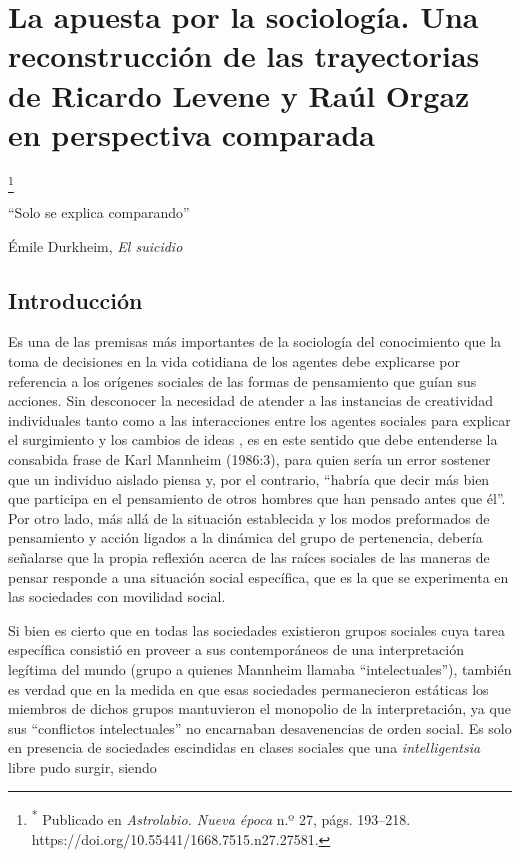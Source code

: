 \mainmatter

\chapter{La apuesta por la sociología. Una reconstrucción de las trayectorias de Ricardo Levene y Raúl Orgaz en perspectiva comparada}

\footnote{\textsuperscript{*} Publicado en \emph{Astrolabio. Nueva época} n.º 27, págs. 193--218. https://doi.org/10.55441/1668.7515.n27.27581.}

\enquote{Solo se explica comparando}

Émile Durkheim, \emph{El suicidio}

\section{Introducción}

Es una de las premisas más importantes de la sociología del conocimiento que la toma de decisiones en la vida cotidiana de los agentes debe explicarse por referencia a los orígenes sociales de las formas de pensamiento que guían sus acciones. Sin desconocer la necesidad de atender a las instancias de creatividad individuales tanto como a las interacciones entre los agentes sociales para explicar el surgimiento y los cambios de ideas \parencite{1527-SALES2007}, es en este sentido que debe entenderse la consabida frase de Karl Mannheim (1986:3), para quien sería un error sostener que un individuo aislado piensa y, por el contrario, \enquote{habría que decir más bien que participa en el pensamiento de otros hombres que han pensado antes que él}. Por otro lado, más allá de la situación establecida y los modos preformados de pensamiento y acción ligados a la dinámica del grupo de pertenencia, debería señalarse que la propia reflexión acerca de las raíces sociales de las maneras de pensar responde a una situación social específica, que es la que se experimenta en las sociedades con movilidad social.

Si bien es cierto que en todas las sociedades existieron grupos sociales cuya tarea específica consistió en proveer a sus contemporáneos de una interpretación legítima del mundo (grupo a quienes Mannheim llamaba \enquote{intelectuales}), también es verdad que en la medida en que esas sociedades permanecieron estáticas los miembros de dichos grupos mantuvieron el monopolio de la interpretación, ya que sus \enquote{conflictos intelectuales} no encarnaban desavenencias de orden social. Es solo en presencia de sociedades escindidas en clases sociales que una \emph{intelligentsia} libre pudo surgir, siendo

